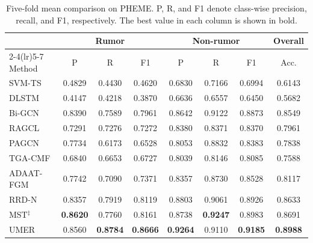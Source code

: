 \documentclass[sigconf,anonymous,review]{../acmart/acmart}
\newcommand{\method}{\textsc{UMER}}
\begin{document}
\begin{table}[!t]
  \caption{Five-fold mean comparison on PHEME.  P, R, and F1 denote
  class-wise precision, recall, and F1, respectively.  The best value in each
  column is shown in bold.}
  \label{tab:pheme-results}
  \centering
  \small
  \setlength{\tabcolsep}{7.2pt}
  \begin{tabular}{@{}lccccccc@{}}
    \toprule
    & \multicolumn{3}{c}{Rumor} &
      \multicolumn{3}{c}{Non-rumor} & Overall \\
    \cmidrule(lr){2-4}\cmidrule(lr){5-7}
    Method & P & R & F1 & P & R & F1 & Acc. \\
    \midrule
    SVM-TS       & 0.4829 & 0.4430 & 0.4620 & 0.6830 & 0.7166 & 0.6994 & 0.6143 \\
    DLSTM        & 0.4147 & 0.4218 & 0.3870 & 0.6636 & 0.6557 & 0.6450 & 0.5682 \\
    Bi-GCN
                  & 0.8390 & 0.7589 & 0.7961 & 0.8642 & 0.9122 & 0.8873 & 0.8549 \\
    RAGCL
                  & 0.7291 & 0.7276 & 0.7272 & 0.8380 & 0.8371 & 0.8370 & 0.7961 \\
    PAGCN         & 0.7734 & 0.6173 & 0.6528 & 0.8053 & 0.8832 & 0.8383 & 0.7838 \\
    TGA-CMF       & 0.6840 & 0.6653 & 0.6727 & 0.8039 & 0.8146 & 0.8085 & 0.7588 \\
    ADAAT-FGM     & 0.7742 & 0.7090 & 0.7371 & 0.8357 & 0.8730 & 0.8528 & 0.8117 \\
    RRD-N
                  & 0.8357 & 0.7919 & 0.8119 & 0.8803 & 0.9061 & 0.8926 & 0.8633 \\
    MST$^{\ddagger}$
                  & \textbf{0.8620} & 0.7760 & 0.8161 & 0.8738 &
                    \textbf{0.9247} & 0.8983 & 0.8691 \\
    \midrule
    \method       & 0.8560 & \textbf{0.8784} & \textbf{0.8666} &
                    \textbf{0.9264} & 0.9110 & \textbf{0.9185} &
                    \textbf{0.8988} \\
    \bottomrule
  \end{tabular}
\end{table}
\end{document}
